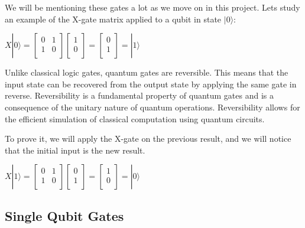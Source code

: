 \documentclass[inscr,ack,preface]{diphdthesis}
\begin{document}
We will be mentioning these gates a lot as we move on in this project.
Lets study an example of the X-gate matrix applied to a \acrshort{qubit} in state $|0\rangle$:
\Large
\begin{center}
$X|0\rangle = \begin{bmatrix}
0 & 1 \\
1 & 0 \\
\end{bmatrix}
\begin{bmatrix}
1 \\
0 \\
\end{bmatrix} = 
\begin{bmatrix}
0 \\
1 \\
\end{bmatrix} = |1\rangle$

\end{center}
\normalsize

Unlike classical logic gates, quantum gates are reversible. This means that the input state can be recovered from the output state by applying the same gate in reverse. Reversibility is a fundamental property of quantum gates and is a consequence of the unitary nature of quantum operations. Reversibility allows for the efficient simulation of classical computation using quantum circuits.

To prove it, we will apply the X-gate on the previous result, and we will notice that the initial input is the new result.

\Large
\begin{center}
$X|1\rangle = \begin{bmatrix}
0 & 1 \\
1 & 0 \\
\end{bmatrix}
\begin{bmatrix}
0 \\
1 \\
\end{bmatrix} = 
\begin{bmatrix}
1 \\
0 \\
\end{bmatrix} = |0\rangle$

\end{center}
\normalsize

\subsection{Single Qubit Gates}
\end{document}
